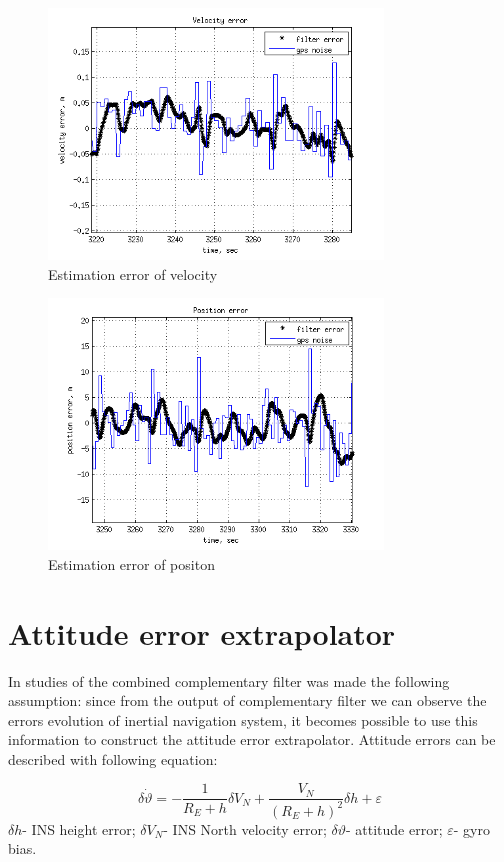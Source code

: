 \documentclass[conference, utf8]{IEEEtran}
\begin{document}
\begin{figure}[!t]
  \centering
  \includegraphics[width=3.5in]{vn_err_of_err}
  \caption{Estimation error of velocity}
  \label{fig:coomp_v}
\end{figure}

\begin{figure}[!t]
  \centering
  \includegraphics[width=3.5in]{phi_err_of_err}
  \caption{Estimation error of positon}
  \label{fig:comp_pos}
\end{figure}

\section{ Attitude error extrapolator}

In studies of the combined complementary filter was made the following assumption: since 
from the output of complementary filter we can observe the errors evolution of inertial 
navigation system, it becomes possible to use this information to construct the attitude 
error extrapolator. Attitude errors can be described with following equation:

\begin{equation}
 \delta \dot{\vartheta }=-\frac{1}{R_{E} +h} \delta V_{N} +\frac{V_{N} }{(R_{E} +h)^{2} } \delta h+\varepsilon
 \label{eq:ins_att}
\end{equation}
$\delta h$- INS height error; 
$\delta V_{N} $- INS North velocity error; 
$\delta \vartheta $- attitude error; 
$\varepsilon $- gyro bias.
\end{document}
